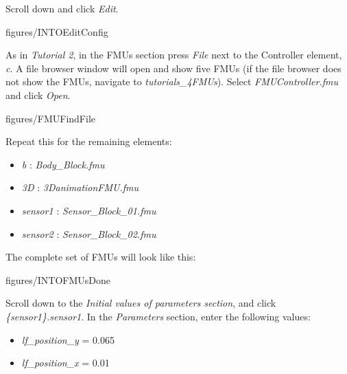 \documentclass[11pt,a4paper]{../tutorial}
\begin{document}
\begin{instructions}
\item Scroll down and click \emph{Edit}.

    \begin{annotation}[width=0.85\linewidth,trim=0 0 0 260,clip]{figures/INTOEditConfig}
    \end{annotation}

\item As in \emph{Tutorial 2}, in the FMUs section press \emph{File} next to the Controller element, \emph{c}. A file browser window will open and show five FMUs (if the file browser does not show the FMUs, navigate to \emph{tutorials\_4\pathsep{}FMUs}). Select \emph{FMUController.fmu} and click \emph{Open}.

    \begin{annotation}[width=0.8\linewidth]{figures/FMUFindFile}
    \end{annotation}

\item Repeat this for the remaining elements:
    \begin{itemize}
        \item \emph{b} : \emph{Body\_Block.fmu}
        \item \emph{3D} : \emph{3DanimationFMU.fmu}
        \item \emph{sensor1} : \emph{Sensor\_Block\_01.fmu}
    \item \emph{sensor2} : \emph{Sensor\_Block\_02.fmu}
    \end{itemize}

    The complete set of FMUs will look like this:

    \begin{annotation}[width=0.85\linewidth,trim=0 0 0 0,clip]{figures/INTOFMUsDone}
    \end{annotation}

\newpage
\item Scroll down to the \emph{Initial values of parameters section}, and click \emph{\{sensor1\}.sensor1}. In the \emph{Parameters} section, enter the following values:

    \begin{itemize}
        \item \emph{lf\_position\_y} = 0.065
        \item \emph{lf\_position\_x} = 0.01
    \end{itemize}


\end{instructions}
\end{document}

